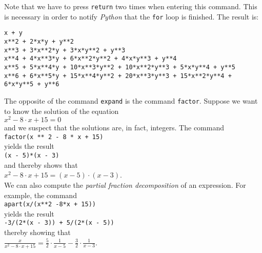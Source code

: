 \documentclass{report}
\newcommand{\ds}{\displaystyle}
\begin{document}
Note that we have to press \texttt{return} two times when entering this command.  This is necessary
in order to notify \textsl{Python} that the \texttt{for} loop is finished.  The result is:
\begin{verbatim}
x + y
x**2 + 2*x*y + y**2
x**3 + 3*x**2*y + 3*x*y**2 + y**3
x**4 + 4*x**3*y + 6*x**2*y**2 + 4*x*y**3 + y**4
x**5 + 5*x**4*y + 10*x**3*y**2 + 10*x**2*y**3 + 5*x*y**4 + y**5
x**6 + 6*x**5*y + 15*x**4*y**2 + 20*x**3*y**3 + 15*x**2*y**4 + 6*x*y**5 + y**6
\end{verbatim}
The opposite of the command \texttt{expand} is the command \texttt{factor}.  Suppose we want to know
the solution of the equation
\\[0.2cm]
\hspace*{1.3cm}
$x^2 - 8 \cdot x + 15 = 0$
\\[0.2cm]
and we suspect that the solutions are, in fact, integers.  The command
\\[0.2cm]
\hspace*{1.3cm}
\texttt{factor(x ** 2 - 8 * x + 15)}
\\[0.2cm]
yields the result
\\[0.2cm]
\hspace*{1.3cm}
\texttt{(x - 5)*(x - 3)}
\\[0.2cm]
and thereby shows that
\\[0.2cm]
\hspace*{1.3cm}
$x^2 - 8 \cdot x + 15 = (x - 5) \cdot (x - 3)$.
\\[0.2cm]
We can also compute the \emph{partial fraction decomposition} of an expression.  For example, the
command  
\\[0.2cm]
\hspace*{1.3cm}
\texttt{apart(x/(x**2 -8*x + 15))}
\\[0.2cm]
yields the result
\\[0.2cm]
\hspace*{1.3cm}
\texttt{-3/(2*(x - 3)) + 5/(2*(x - 5))}
\\[0.2cm]
thereby showing that
\\[0.2cm]
\hspace*{1.3cm}
$\ds \frac{x}{x^2 - 8 \cdot x + 15} = \frac{5}{2} \cdot \frac{1}{x-5} - \frac{3}{2} \cdot \frac{1}{x-3}$.
\end{document}
